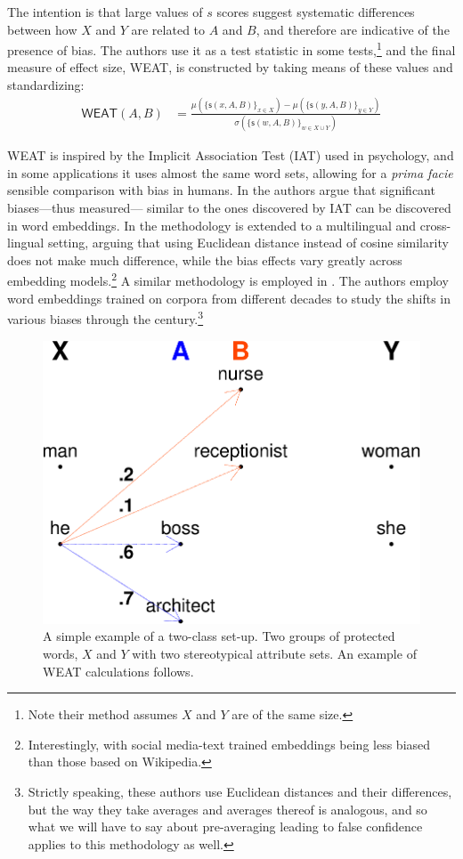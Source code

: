 \documentclass{clv3}
\begin{document}
\noindent The intention is that large values of \(s\) scores suggest
systematic differences between how \(X\) and \(Y\) are related to \(A\)
and \(B\), and therefore are indicative of the presence of bias. The
authors use it as a test statistic in some tests,\footnote{Note their
  method assumes \(X\) and \(Y\) are of the same size.} and the final
measure of effect size, \textsf{WEAT}, is constructed by taking means of
these values and standardizing: \begin{align} \label{eq:weat}
\mathsf{WEAT}(A,B) & = \frac{
\mu(\{\mathsf{s}(x,A,B)\}_{x\in X}) -\mu(\{\mathsf{s}(y,A,B)\}_{y\in Y}) 
}{
\sigma(\{\mathsf{s}(w,A,B)\}_{w\in X\cup Y})
}
\end{align}

\textsf{WEAT} is inspired by the Implicit Association Test (IAT)
\citep{Nosek2002harvesting} used in psychology, and in some applications it uses almost the
same word sets, allowing for a \emph{prima facie} sensible comparison
with bias in humans. In \citep{Caliskan2017semanticsBiases} the authors argue that significant
biases---thus measured--- similar to the ones discovered by IAT can be
discovered in word embeddings. In \citep{Lauscher2019multidimensional} the methodology is extended
to a multilingual and cross-lingual setting, arguing that using
Euclidean distance instead of cosine similarity does not make much
difference, while the bias effects vary greatly across embedding
models.\footnote{Interestingly, with social media-text trained
  embeddings being less biased than those based on Wikipedia.} A similar
methodology is employed in \citep{Garg2018years}. The authors employ word embeddings
trained on corpora from different decades to study the shifts in various
biases through the century.\footnote{Strictly speaking, these authors
  use Euclidean distances and their differences, but the way they take
  averages and averages thereof is analogous, and so what we will have
  to say about pre-averaging leading to false confidence applies to this
  methodology as well.}

\begin{figure}

\begin{center}\includegraphics[width=0.55\linewidth]{figures/WEATexample5} \end{center}
\caption{A simple example of a two-class set-up. Two groups of protected words, $X$ and $Y$ with two stereotypical attribute sets. An example of \textsf{WEAT} calculations follows.}
\label{eq:WEATexample}
\end{figure}
\end{document}
